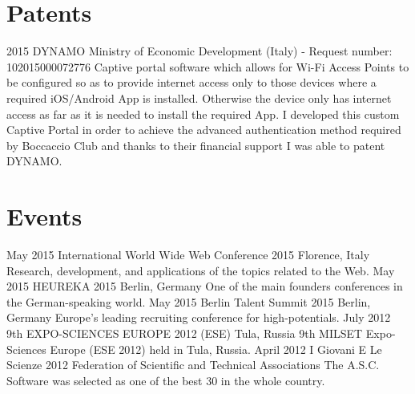 \documentclass[]{friggeri-cv}
\begin{document}
\section{Patents}
\vspace{-3mm}
\begin{entrylist}
\entry
{2015}
{DYNAMO}
{Ministry of Economic Development (Italy) - Request number: 102015000072776}
{Captive portal software which allows for Wi-Fi Access Points to be configured so as to provide internet access only to those devices where a required iOS/Android App is installed. Otherwise the device only has internet access as far as it is needed to install the required App. I developed this custom Captive Portal in order to achieve the advanced authentication method required by Boccaccio Club and thanks to their financial support I was able to patent DYNAMO.}
\end{entrylist}


\section{Events}
\vspace{-3mm}
\begin{entrylist}
\entry
{May 2015}
{International World Wide Web Conference 2015}
{Florence, Italy}
{Research, development, and applications of the topics related to the Web.}
\entry
{May 2015}
{HEUREKA 2015}
{Berlin, Germany}
{One of the main founders conferences in the German­-speaking world.}
\entry
{May 2015}
{Berlin Talent Summit 2015}
{Berlin, Germany}
{Europe's leading recruiting conference for high-potentials.}
\entry
{July 2012}
{9th EXPO-SCIENCES EUROPE 2012 (ESE)}
{Tula, Russia}
{9th MILSET Expo-Sciences Europe (ESE 2012) held in Tula, Russia.}
\entry
{April 2012}
{I Giovani E Le Scienze 2012}
{Federation of Scientific and Technical Associations}
{The A.S.C. Software was selected as one of the best 30 in the whole country.}
\end{entrylist}
\end{document}
